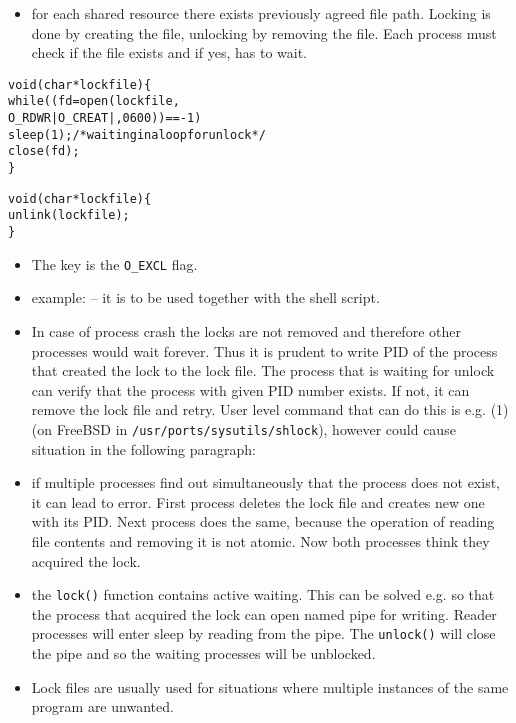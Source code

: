 \begin{slide}
\begin{itemize}
\item for each shared resource there exists previously agreed file path.
Locking is done by creating the file, unlocking by removing the file.
Each process must check if the file exists and if yes, has to wait.
\end{itemize}
\begin{alltt}
void (char *lockfile) \{ 
    while( (fd = open(lockfile, 
                      O\_RDWR|O\_CREAT|, 0600)) == -1) 
        sleep(1); {\rm /* waiting in a loop for unlock */}
    close(fd); 
\} 

void (char *lockfile) \{ 
    unlink(lockfile); 
\}
\end{alltt}
\end{slide}

\begin{itemize}
\item \label{LOCK_UNLOCK} The key is the \texttt{O\_EXCL} flag.
\item example:  -- it is to be used together
with the  shell script.
\item In case of process crash the locks are not removed and therefore other
processes would wait forever. Thus it is prudent to write PID of the process 
that created the lock to the lock file. The process that is waiting for unlock
can verify that the process with given PID number exists. If not, it can remove
the lock file and retry. User level command that can do this is e.g.
(1) (on FreeBSD in \texttt{/usr/ports/sysutils/shlock}), however
could cause situation in the following paragraph:
\item {} if multiple processes find out simultaneously that
the process does not exist, it can lead to error. First process deletes the
lock file and creates new one with its PID. Next process does the same,
because the operation of reading file contents and removing it is not atomic.
Now both processes think they acquired the lock.
\item {} the \texttt{lock()} function contains active waiting.
This can be solved e.g. so that the process that acquired the lock can open
named pipe for writing. Reader processes will enter sleep by reading from the
pipe.
The \texttt{unlock()} will close the pipe and so the waiting processes will
be unblocked.
\item Lock files are usually used for situations where multiple instances of
the same program are unwanted.
\end{itemize}

